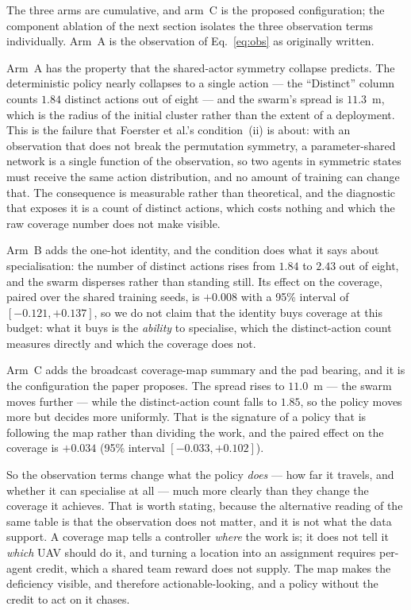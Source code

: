 
The three arms are cumulative, and arm~C is the proposed configuration; the
component ablation of the next section isolates the three observation terms
individually.  Arm~A is the observation of Eq.~\eqref{eq:obs} as originally
written.

Arm~A has the property that the shared-actor symmetry collapse predicts.
The deterministic policy nearly collapses to a single action --- the
``Distinct'' column counts $1.84$ distinct actions out of eight --- and
the swarm's spread is $11.3$~m, which is the radius of the initial
cluster rather than the extent of a deployment.  This is the failure that
Foerster et al.'s condition~(ii) is about: with an observation that does not
break the permutation symmetry, a parameter-shared network is a single
function of the observation, so two agents in symmetric states must receive
the same action distribution, and no amount of training can change that.
The consequence is measurable rather than theoretical, and the diagnostic
that exposes it is a count of distinct actions, which costs nothing and
which the raw coverage number does not make visible.

Arm~B adds the one-hot identity, and the condition does what it says about
specialisation: the number of distinct actions rises from $1.84$ to
$2.43$ out of eight, and the swarm disperses rather than standing
still.  Its effect on the coverage, paired over the shared training seeds,
is $+0.008$ with a 95\% interval of $[-0.121, +0.137]$, so we do
not claim that the identity buys coverage at this budget: what it buys is
the \emph{ability} to specialise, which the distinct-action count measures
directly and which the coverage does not.

Arm~C adds the broadcast coverage-map summary and the pad bearing, and it
is the configuration the paper proposes.  The spread rises to
$11.0$~m --- the swarm moves further --- while the distinct-action
count falls to $1.85$, so the policy moves more but decides more
uniformly.  That is the signature of a policy that is following the map
rather than dividing the work, and the paired effect on the coverage is
$+0.034$ (95\% interval $[-0.033, +0.102]$).

So the observation terms change what the policy \emph{does} --- how far it
travels, and whether it can specialise at all --- much more clearly than
they change the coverage it achieves.  That is worth stating, because the
alternative reading of the same table is that the observation does not
matter, and it is not what the data support.  A coverage map tells a
controller \emph{where} the work is; it does not tell it \emph{which} UAV
should do it, and turning a location into an assignment requires per-agent
credit, which a shared team reward does not supply.  The map makes the
deficiency visible, and therefore actionable-looking, and a policy without
the credit to act on it chases.

